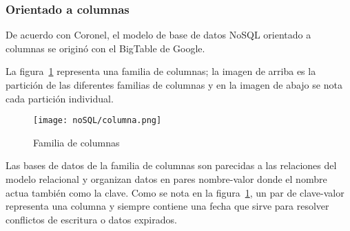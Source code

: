 \subsubsection{Orientado a columnas}
De acuerdo con Coronel\cite{coronel_database_nodate}, el modelo de base de datos NoSQL orientado a columnas se originó con el BigTable de Google. 

La figura~\ref{img:familia-columna} representa una familia de columnas; la imagen de arriba es la partición de las diferentes familias de columnas y en la imagen de abajo se nota cada partición individual.

\begin{figure}[H] 
    \centering
    \texttt{[image: noSQL/columna.png]}
    \caption{Familia de columnas}
    \label{img:familia-columna}
\end{figure}


Las bases de datos de la familia de columnas son parecidas a las relaciones del modelo relacional y organizan datos en pares nombre-valor donde el nombre actua también como la clave. Como se nota en la figura~\ref{img:familia-columna}, un par de clave-valor representa una columna y siempre contiene una fecha que sirve para resolver conflictos de escritura o datos expirados.

